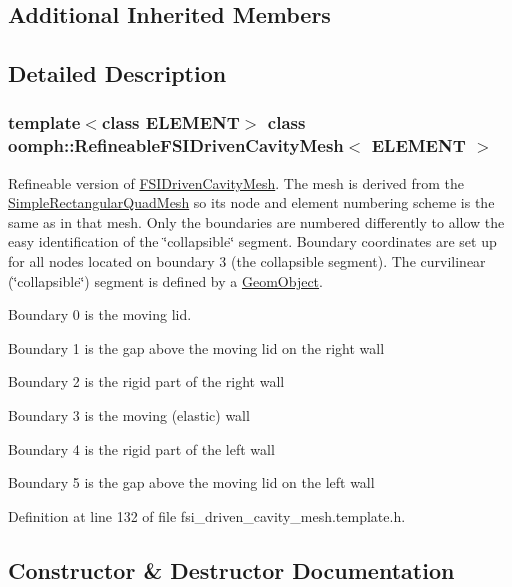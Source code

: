 \subsection*{Additional Inherited Members}


\subsection{Detailed Description}
\subsubsection*{template$<$class E\+L\+E\+M\+E\+NT$>$\newline
class oomph\+::\+Refineable\+F\+S\+I\+Driven\+Cavity\+Mesh$<$ E\+L\+E\+M\+E\+N\+T $>$}

Refineable version of \hyperlink{classoomph_1_1FSIDrivenCavityMesh}{F\+S\+I\+Driven\+Cavity\+Mesh}. The mesh is derived from the {\ttfamily \hyperlink{classoomph_1_1SimpleRectangularQuadMesh}{Simple\+Rectangular\+Quad\+Mesh}} so it\textquotesingle{}s node and element numbering scheme is the same as in that mesh. Only the boundaries are numbered differently to allow the easy identification of the \char`\"{}collapsible\char`\"{} segment. Boundary coordinates are set up for all nodes located on boundary 3 (the collapsible segment). The curvilinear (\char`\"{}collapsible\char`\"{}) segment is defined by a {\ttfamily \hyperlink{classoomph_1_1GeomObject}{Geom\+Object}}.
\begin{DoxyItemize}
\item Boundary 0 is the moving lid.
\item Boundary 1 is the gap above the moving lid on the right wall
\item Boundary 2 is the rigid part of the right wall
\item Boundary 3 is the moving (elastic) wall
\item Boundary 4 is the rigid part of the left wall
\item Boundary 5 is the gap above the moving lid on the left wall 
\end{DoxyItemize}

Definition at line 132 of file fsi\+\_\+driven\+\_\+cavity\+\_\+mesh.\+template.\+h.



\subsection{Constructor \& Destructor Documentation}
\mbox{\label{classoomph_1_1RefineableFSIDrivenCavityMesh_a91c0ab00784098cb0e583ab0882b0e0e}} 

